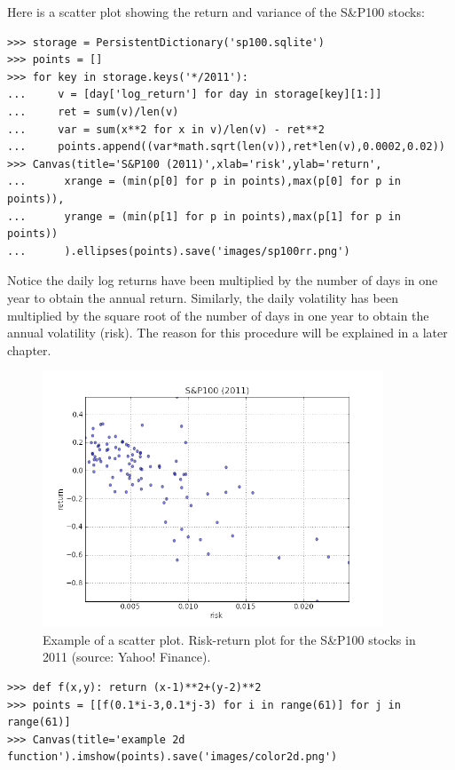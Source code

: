 \documentclass[justified,sixbynine]{tufte-book}
\def\ft{\small\tt}
\theoremstyle{plain}%
\theoremstyle{definition}
\theoremstyle{remark}
\begin{document}
\begin{fullwidth}
Here is a scatter plot showing the return and variance of the S\&P100 stocks:

\begin{lstlisting}[caption={in file: {\ft nlib.py}}]
>>> storage = PersistentDictionary('sp100.sqlite')
>>> points = []
>>> for key in storage.keys('*/2011'):
...     v = [day['log_return'] for day in storage[key][1:]]
...     ret = sum(v)/len(v)
...     var = sum(x**2 for x in v)/len(v) - ret**2
...     points.append((var*math.sqrt(len(v)),ret*len(v),0.0002,0.02))
>>> Canvas(title='S&P100 (2011)',xlab='risk',ylab='return',
...      xrange = (min(p[0] for p in points),max(p[0] for p in points)),
...      yrange = (min(p[1] for p in points),max(p[1] for p in points))
...      ).ellipses(points).save('images/sp100rr.png')
\end{lstlisting}
Notice the daily log returns have been multiplied by the number of days in one year to obtain the annual return. Similarly, the daily volatility has been multiplied by the square root of the number of days in one year to obtain the annual volatility (risk). The reason for this procedure will be explained in a later chapter.

\begin{figure}[ht]
\centering\includegraphics[width=4in]{images/sp100rr.png}
\caption{Example of a scatter plot. Risk-return plot for the S\&P100 stocks in 2011 (source: Yahoo! Finance).}
\end{figure}

\begin{lstlisting}[caption={in file: {\ft nlib.py}}]
>>> def f(x,y): return (x-1)**2+(y-2)**2
>>> points = [[f(0.1*i-3,0.1*j-3) for i in range(61)] for j in range(61)]
>>> Canvas(title='example 2d function').imshow(points).save('images/color2d.png')
\end{lstlisting}


\end{fullwidth}
\end{document}
